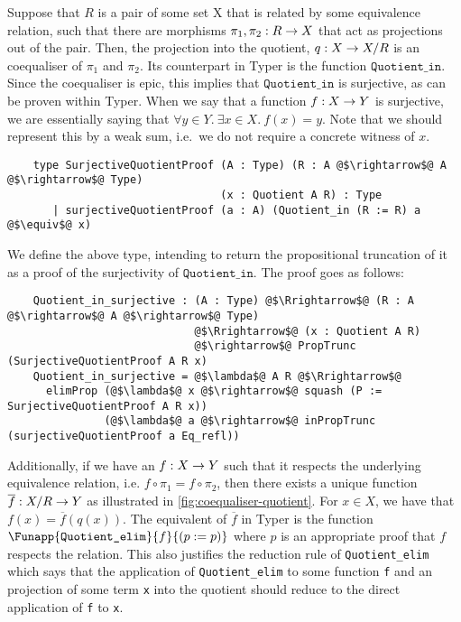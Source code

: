 \documentclass[12pt,twoside,maitrise]{dms}
\theoremstyle{definition}
\numberwithin{equation}{section}
\numberwithin{table}{chapter}
\numberwithin{figure}{chapter}
\newcommand\id[1] {\texttt{#1}}
\begin{document}
Suppose that $R$ is a pair of some set X that is related by some equivalence
relation, such that there are morphisms $\oftype{\pi_1, \pi_2}{R \rightarrow X}$
that act as projections out of the pair. Then, the projection into the quotient,
$\oftype{q}{X \rightarrow X/R}$ is an coequaliser of $\pi_1$ and $\pi_2$. Its
counterpart in Typer is the function $\id{Quotient\_in}$. Since the coequaliser
is epic, this implies that $\id{Quotient\_in}$ is surjective, as can be proven
within Typer. When we say that a function $\oftype{f}{X \rightarrow Y}$ is
surjective, we are essentially saying that $\forall y \in Y. \ \exists x \in X.
\ f(x) = y$. Note that we should represent this by a weak sum, i.e.\ we do not
require a concrete witness of $x$.

\begin{verbatim}
    type SurjectiveQuotientProof (A : Type) (R : A @$\rightarrow$@ A @$\rightarrow$@ Type)
                                 (x : Quotient A R) : Type
       | surjectiveQuotientProof (a : A) (Quotient_in (R := R) a @$\equiv$@ x)
\end{verbatim}

We define the above type, intending to return the propositional truncation of it
as a proof of the surjectivity of $\id{Quotient\_in}$. The proof goes as
follows:

\begin{verbatim}
    Quotient_in_surjective : (A : Type) @$\Rrightarrow$@ (R : A @$\rightarrow$@ A @$\rightarrow$@ Type)
                             @$\Rrightarrow$@ (x : Quotient A R)
                             @$\rightarrow$@ PropTrunc (SurjectiveQuotientProof A R x)
    Quotient_in_surjective = @$\lambda$@ A R @$\Rrightarrow$@
      elimProp (@$\lambda$@ x @$\rightarrow$@ squash (P := SurjectiveQuotientProof A R x))
               (@$\lambda$@ a @$\rightarrow$@ inPropTrunc (surjectiveQuotientProof a Eq_refl))
\end{verbatim}

Additionally, if we have an $\oftype{f}{X \rightarrow Y}$ such that it respects
the underlying equivalence relation, i.e. $f \circ \pi_1 = f \circ \pi_2$, then
there exists a unique function $\oftype{\overline{f}}{X/R \rightarrow Y}$ as
illustrated in \autoref{fig:coequaliser-quotient}. For $x \in X$, we have that
$f(x) = \overline{f}(q(x))$. The equivalent of $\overline{f}$ in Typer is the
function $\Funapp{\id{Quotient\_elim}}{f}{(\earg{p}{p})}$ where $p$ is an
appropriate proof that $f$ respects the relation. This also justifies the
reduction rule of \id{Quotient\_elim} which says that the application of
\id{Quotient\_elim} to some function \id{f} and an projection of some term
\id{x} into the quotient should reduce to the direct application of \id{f} to
\id{x}.
\end{document}
